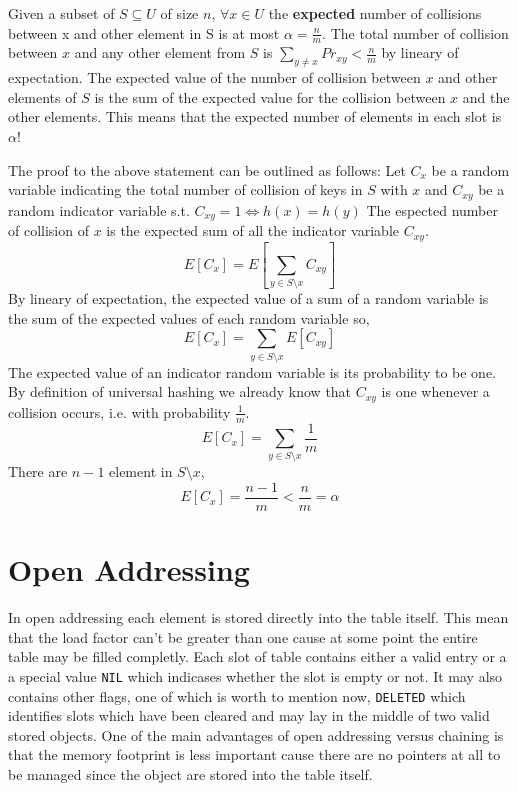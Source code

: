 Given a subset of $S \subseteq U$ of size $n$, $\forall x \in U$ the \textbf{expected} number of collisions between x and other element in S is at most $\alpha = \frac{n}{m}$. The total number of collision between $x$ and any other element from $S$ is $\sum_{y\neq x} Pr_{xy} < \frac{n}{m}$ by lineary of expectation. The expected value of the number of collision between $x$ and other elements of $S$ is the sum of the expected value for the collision between $x$ and the other elements.  This means that the expected number of elements in each slot is $\alpha$!

The proof to the above statement can be outlined as follows:
Let $C_x$ be a random variable indicating the total number of collision of keys in $S$ with $x$ and $C_{xy}$ be a random indicator variable  s.t. $C_{xy}=1 \Longleftrightarrow h(x)=h(y)$
The espected number of collision of $x$ is the expected sum of all the indicator variable $C_{xy}$.
\[
E[C_x] = E[\sum_{y\in S \setminus x} C_{xy}]
\]
By lineary of expectation, the expected value of a sum of a random variable is the sum of the expected values of each random variable so,
\[
E[C_x] = \sum_{y\in S \setminus x} E[C_{xy}]
\]
The expected value of an indicator random variable is its probability to be one. By definition of universal hashing we already know that $C_{xy}$ is one whenever a collision occurs, i.e. with probability $\frac{1}{m}$. 
\[
E[C_x] = \sum_{y\in S \setminus x} \frac{1}{m}
\]
There are $n-1$ element in $S \setminus x$,
\[
E[C_x] = \frac{n-1}{m} < \frac{n}{m}=\alpha
\]

\section{Open Addressing}
In open addressing each element is stored directly into the table itself. This mean that the load factor can't be greater than one cause at some point the entire table may be filled completly. Each slot of table contains either a valid entry or a a special value \texttt{NIL} which indicases whether the slot is empty or not. 
It may also contains other flags, one of which is worth to mention now, \texttt{DELETED} which identifies slots which have been cleared and may lay in the middle of two valid stored objects. 
One of the main advantages of open addressing versus chaining is that the memory footprint is less important cause there are no pointers at all to be managed since the object are stored into the table itself. 

